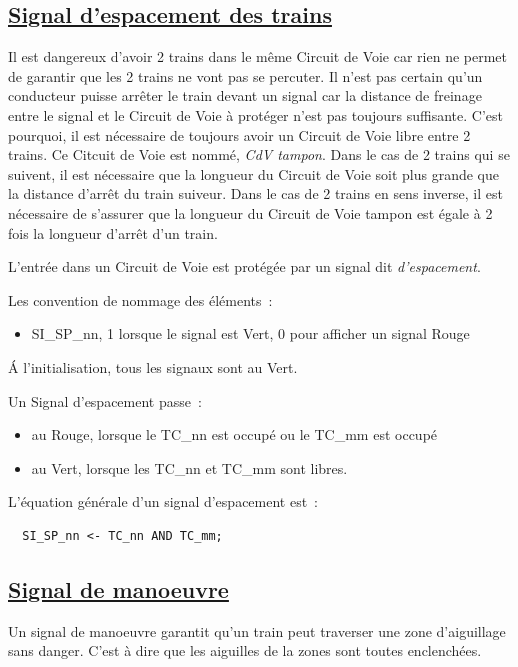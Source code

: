\subsection{\underline{Signal d'espacement des trains}}
\label{sec:esp}

Il est dangereux d'avoir 2 trains dans le même Circuit de Voie car rien  ne 
permet de garantir que les 2 trains ne vont pas se percuter. Il n'est pas certain
qu'un conducteur puisse arrêter le train devant un signal car la distance de
freinage entre le signal et le Circuit de Voie à protéger n'est pas toujours 
suffisante. C'est pourquoi, il est nécessaire de toujours avoir un Circuit de Voie 
libre entre 2 trains. Ce Citcuit de Voie est nommé, \emph{CdV tampon}. 
Dans le cas de 2 trains qui se suivent, il est nécessaire que la longueur du Circuit 
de Voie soit plus grande que la distance d'arrêt du train suiveur.
Dans le cas de 2 trains en sens inverse, il est nécessaire de s'assurer que la
longueur du Circuit de Voie tampon est égale à 2 fois la longueur d'arrêt 
d'un train. 

L'entrée dans un Circuit de Voie est protégée par un signal dit \emph{d'espacement}.

Les convention de nommage des éléments~:
\begin{itemize}
\item SI\_SP\_nn, 1 lorsque le signal est Vert, 0 pour afficher un signal Rouge
\end{itemize}

\'A l'initialisation, tous les signaux sont au Vert. 

Un Signal d'espacement passe~:
\begin{itemize}
\item au Rouge, lorsque le TC\_nn est occupé ou le TC\_mm est occupé
\item au Vert, lorsque les TC\_nn et TC\_mm sont libres.
\end{itemize}

\medskip
L'équation générale d'un signal d'espacement est~:
\begin{lstlisting}
  SI_SP_nn <- TC_nn AND TC_mm;
\end{lstlisting}


\subsection{\underline{Signal de manoeuvre}}
\label{sec:esp}

Un signal de manoeuvre garantit qu'un train peut traverser une zone d'aiguillage 
sans danger. C'est à dire que les aiguilles de la zones sont toutes enclenchées.





